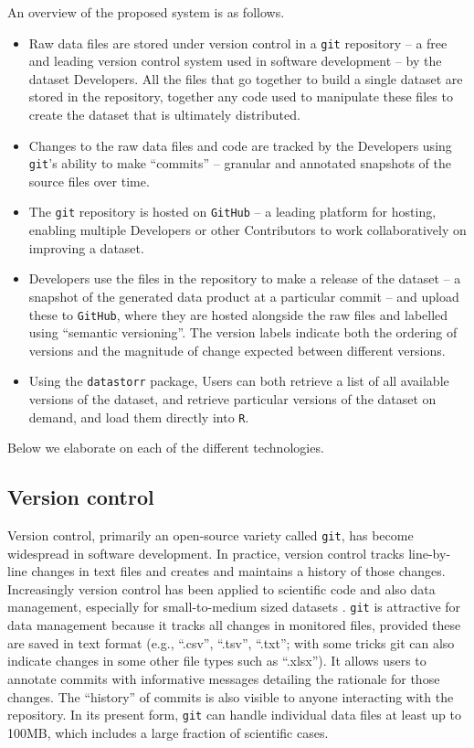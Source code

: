 \documentclass[a4paper,num-refs]{assets/oup-contemporary}
\begin{document}
An overview of the proposed system is as follows.
\begin{itemize}
  \item Raw data files are stored under version control in a \texttt{git} repository --  a free and leading version control system used in software development -- by the dataset Developers. All the files that go together to build a single dataset are stored in the repository, together any code used to manipulate these files to create the dataset that is ultimately distributed.
  \item Changes to the raw data files and code are tracked by the Developers using  \texttt{git}'s ability to make ``commits'' -- granular and annotated snapshots of the source files over time.
  \item The \texttt{git} repository is hosted on \texttt{GitHub} -- a leading platform for hosting, enabling multiple Developers or other Contributors to work collaboratively on improving a dataset.
  \item Developers use the files in the repository to make a release of the dataset -- a snapshot of the generated data product at a particular commit -- and upload these to \texttt{GitHub}, where they are hosted alongside the raw files and labelled using ``semantic versioning''. The version labels indicate both the ordering of versions and the magnitude of change expected between different versions.
  \item Using the \texttt{datastorr} package, Users can both retrieve a list of all available versions of the dataset, and retrieve particular versions of the dataset on demand, and load them directly into \texttt{R}. 
\end{itemize}

Below we elaborate on each of the different technologies.

\subsection{Version control}

Version control, primarily an open-source variety called \texttt{git}, has become widespread in software development. In practice, version control tracks line-by-line changes in text files and creates and maintains a history of those changes. Increasingly version control has been applied to scientific code and also data management, especially for small-to-medium sized datasets \cite{Ram-2013, Perkel-2016, Lowndes-2017}. \texttt{git} is attractive for data management because it tracks all changes in monitored files, provided these are saved in text format (e.g., ``.csv'', ``.tsv'', ``.txt''; with some tricks git can also indicate changes in some other file types such as ``.xlsx''). It  allows users to annotate commits with informative messages detailing the rationale for those changes.  The ``history'' of commits is also visible to anyone interacting with the repository. In its present form, \texttt{git} can handle individual data files at least up to 100MB, which includes a large fraction of scientific cases.
\end{document}
